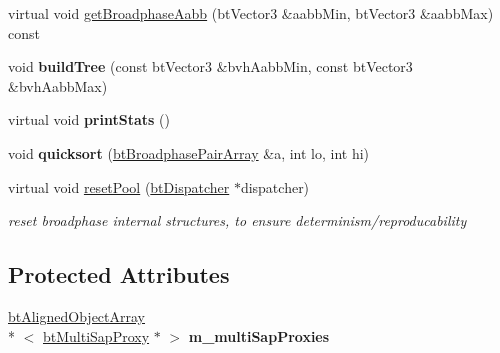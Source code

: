 \begin{DoxyCompactItemize}
\item 
virtual void \hyperlink{classbt_multi_sap_broadphase_a9aacf91a557db1d79faea2b73b8692b7}{get\+Broadphase\+Aabb} (bt\+Vector3 \&aabb\+Min, bt\+Vector3 \&aabb\+Max) const 
\item 
\hypertarget{classbt_multi_sap_broadphase_a2ab67fb07b7e1d4af1fbd46458bc7710}{void {\bfseries build\+Tree} (const bt\+Vector3 \&bvh\+Aabb\+Min, const bt\+Vector3 \&bvh\+Aabb\+Max)}\label{classbt_multi_sap_broadphase_a2ab67fb07b7e1d4af1fbd46458bc7710}

\item 
\hypertarget{classbt_multi_sap_broadphase_a9a2c086a64d8533cb92f3c3715c008ab}{virtual void {\bfseries print\+Stats} ()}\label{classbt_multi_sap_broadphase_a9a2c086a64d8533cb92f3c3715c008ab}

\item 
\hypertarget{classbt_multi_sap_broadphase_a873d57f7b14c9dcb773007e07510a3a3}{void {\bfseries quicksort} (\hyperlink{classbt_aligned_object_array}{bt\+Broadphase\+Pair\+Array} \&a, int lo, int hi)}\label{classbt_multi_sap_broadphase_a873d57f7b14c9dcb773007e07510a3a3}

\item 
\hypertarget{classbt_multi_sap_broadphase_a41e51be9bbe1104bd14ba98eca5aa621}{virtual void \hyperlink{classbt_multi_sap_broadphase_a41e51be9bbe1104bd14ba98eca5aa621}{reset\+Pool} (\hyperlink{classbt_dispatcher}{bt\+Dispatcher} $\ast$dispatcher)}\label{classbt_multi_sap_broadphase_a41e51be9bbe1104bd14ba98eca5aa621}

\begin{DoxyCompactList}\small\item\em reset broadphase internal structures, to ensure determinism/reproducability \end{DoxyCompactList}\end{DoxyCompactItemize}
\subsection*{Protected Attributes}
\begin{DoxyCompactItemize}
\item 
\hypertarget{classbt_multi_sap_broadphase_a42b6aa7f8aba775ae25ede7742d4f1c8}{\hyperlink{classbt_aligned_object_array}{bt\+Aligned\+Object\+Array}\\*
$<$ \hyperlink{structbt_multi_sap_broadphase_1_1bt_multi_sap_proxy}{bt\+Multi\+Sap\+Proxy} $\ast$ $>$ {\bfseries m\+\_\+multi\+Sap\+Proxies}}\label{classbt_multi_sap_broadphase_a42b6aa7f8aba775ae25ede7742d4f1c8}

\end{DoxyCompactItemize}


